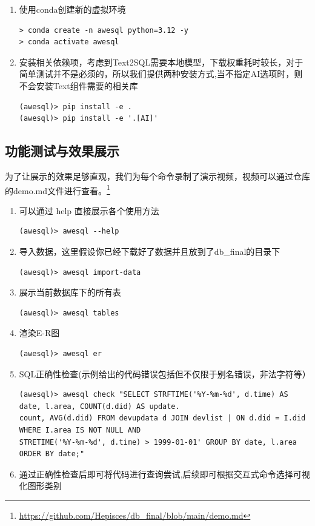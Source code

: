 \begin{CJK*}{UTF8}{song}
\begin{enumerate}
\item 使用conda创建新的虚拟环境
\begin{lstlisting}
> conda create -n awesql python=3.12 -y
> conda activate awesql
\end{lstlisting}

\item 安装相关依赖项，考虑到Text2SQL需要本地模型，下载权重耗时较长，对于简单测试并不是必须的，所以我们提供两种安装方式,当不指定AI选项时，则不会安装Text组件需要的相关库
\begin{lstlisting}
(awesql)> pip install -e .
(awesql)> pip install -e '.[AI]'
\end{lstlisting}
\end{enumerate}

{\begin{CJK*}{UTF8}{zhhei}\subsection{功能测试与效果展示}\end{CJK*}}

为了让展示的效果足够直观，我们为每个命令录制了演示视频，视频可以通过仓库的demo.md文件进行查看。\footnote{
\url{https://github.com/Hepisces/db_final/blob/main/demo.md}}

\begin{enumerate}
    \item 可以通过 help 直接展示各个使用方法

    
    \begin{lstlisting}
(awesql)> awesql --help  
    \end{lstlisting}
    
    \item 导入数据，这里假设你已经下载好了数据并且放到了db\_final的目录下
    \begin{lstlisting}
(awesql)> awesql import-data     
    \end{lstlisting}
    \item 展示当前数据库下的所有表
    \begin{lstlisting}
(awesql)> awesql tables
    \end{lstlisting}
    \item 渲染E-R图
    \begin{lstlisting}
(awesql)> awesql er
    \end{lstlisting}
        \item SQL正确性检查(示例给出的代码错误包括但不仅限于别名错误，非法字符等）
    \begin{lstlisting}
(awesql)> awesql check "SELECT STRFTIME('%Y-%m-%d', d.time) AS date, l.area, COUNT(d.did) AS update.
count, AVG(d.did) FROM devupdata d JOIN devlist | ON d.did = I.did WHERE I.area IS NOT NULL AND
STRETIME('%Y-%m-%d', d.time) > 1999-01-01' GROUP BY date, l.area ORDER BY date;"
    \end{lstlisting}
        \item 通过正确性检查后即可将代码进行查询尝试,后续即可根据交互式命令选择可视化图形类别


\end{enumerate}
\end{CJK*}
